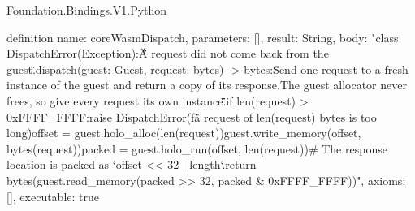\begin{lexlean}{Foundation.Bindings.V1.Python}
\begin{semanticmodule}
definition{
  name: coreWasmDispatch,
  parameters: [],
  result: String,
  body: "class DispatchError(Exception):\n    \"\"\"A request did not come back from the guest.\"\"\"\n\n\ndef dispatch(guest: Guest, request: bytes) -> bytes:\n    \"\"\"Send one request to a fresh instance of the guest and return a copy of its response.\n\n    The guest allocator never frees, so give every request its own instance.\n    \"\"\"\n    if len(request) > 0xFFFF_FFFF:\n        raise DispatchError(f\"a request of {len(request)} bytes is too long\")\n    offset = guest.holo_alloc(len(request))\n    guest.write_memory(offset, bytes(request))\n    packed = guest.holo_run(offset, len(request))\n    # The response location is packed as `offset << 32 | length`.\n    return bytes(guest.read_memory(packed >> 32, packed & 0xFFFF_FFFF))",
  axioms: [],
  executable: true
}


\end{semanticmodule}
\end{lexlean}
